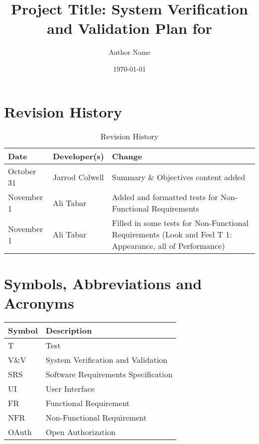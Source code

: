 \documentclass[12pt, titlepage]{article}
\begin{document}
\title{Project Title: System Verification and Validation Plan for \progname{}} 
\author{Author Name}
\date{\today}
	
\maketitle


\section*{Revision History}
\begin{table}[hp]
	\caption{Revision History} \label{TblRevisionHistory}
	\begin{tabularx}{\textwidth}{llX}
		\toprule
		\textbf{Date} & \textbf{Developer(s)} & \textbf{Change}\\
		\midrule
		October 31 & Jarrod Colwell & Summary \& Objectives content added\\
		\midrule
		November 1 & Ali Tabar & Added and formatted tests for Non-Functional Requirements\\
		\midrule
		November 1 & Ali Tabar & Filled in some tests for Non-Functional Requirements (Look and Feel T 1: Appearance, all of Performance)\\
		\bottomrule
	\end{tabularx}
\end{table}

\newpage

\tableofcontents

\listoftables
{}

\listoffigures
{}

\newpage

\section{Symbols, Abbreviations and Acronyms}

\renewcommand{\arraystretch}{1.2}
\begin{tabular}{l | l} 
  \toprule		
  \textbf{Symbol} & \textbf{Description}\\
  \midrule 
  T & Test\\
  V\&V & System Verification and Validation\\
  SRS & Software Requirements Specification\\
  UI & User Interface\\
  FR & Functional Requirement\\
  NFR & Non-Functional Requirement\\
  OAuth & Open Authorization\\
  \bottomrule
\end{tabular}\\
\end{document}
